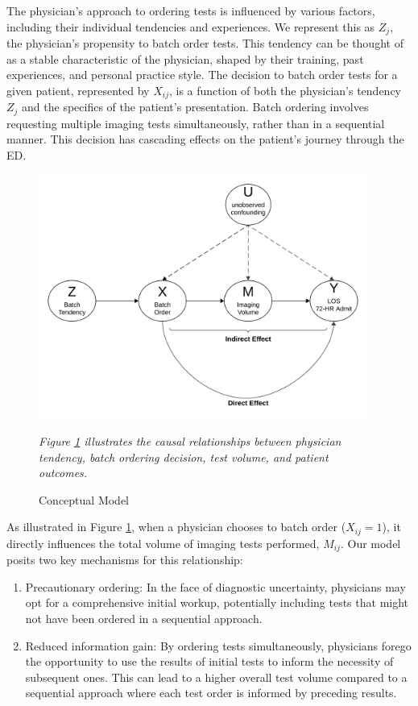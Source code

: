 \documentclass[,,nonblindrev]{informs}
\begin{document}
The physician's approach to ordering tests is influenced by various
factors, including their individual tendencies and experiences. We
represent this as \(Z_j\), the physician's propensity to batch order
tests. This tendency can be thought of as a stable characteristic of the
physician, shaped by their training, past experiences, and personal
practice style. The decision to batch order tests for a given patient,
represented by \(X_{ij}\), is a function of both the physician's
tendency \(Z_j\) and the specifics of the patient's presentation. Batch
ordering involves requesting multiple imaging tests simultaneously,
rather than in a sequential manner. This decision has cascading effects
on the patient's journey through the ED.

\begin{figure}[h]
  \centering
  \caption{Conceptual Model}
  \label{fig:dag}
  \includegraphics[width=4.25in]{model.png}
  \begin{tablenotes}
    \small
    \item \textit{Figure \ref{fig:dag} illustrates the causal relationships between physician tendency, batch ordering decision, test volume, and patient outcomes.}
  \end{tablenotes}
\end{figure}

As illustrated in Figure \ref{fig:dag}, when a physician chooses to
batch order (\(X_{ij} = 1\)), it directly influences the total volume of
imaging tests performed, \(M_{ij}\). Our model posits two key mechanisms
for this relationship:

\begin{enumerate}
  \item Precautionary ordering: In the face of diagnostic uncertainty, physicians may opt for a comprehensive initial workup, potentially including tests that might not have been ordered in a sequential approach.
  \item Reduced information gain: By ordering tests simultaneously, physicians forego the opportunity to use the results of initial tests to inform the necessity of subsequent ones. This can lead to a higher overall test volume compared to a sequential approach where each test order is informed by preceding results.
\end{enumerate}
\end{document}
